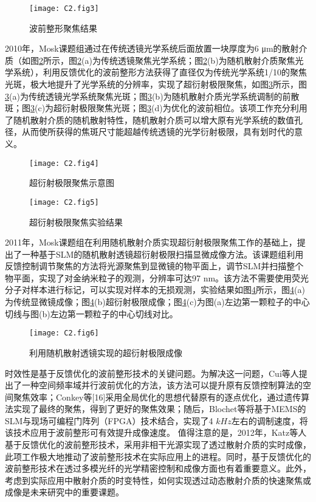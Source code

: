 \begin{figure}[htp]
	\centering
	\texttt{[image: C2.fig3]}
	\caption{波前整形聚焦结果}
	\label{fig2:3}
\end{figure}

2010年，Mosk课题组通过在传统透镜光学系统后面放置一块厚度为6 μm的散射介质（如图\ref{fig2:4}所示，图\ref{fig2:4}(a)为传统透镜聚焦光学系统；图\ref{fig2:4}(b)为随机散射介质聚焦光学系统），利用反馈优化的波前整形方法获得了直径仅为传统光学系统1/10的聚焦光斑，极大地提升了光学系统的分辨率，实现了超衍射极限聚焦，如图\ref{fig2:5}所示，图\ref{fig2:5}(a)为传统透镜光学系统聚焦光斑；图\ref{fig2:5}(b)为随机散射介质光学系统调制的前散斑；图\ref{fig2:5}(c)为超衍射极限聚焦光斑；图\ref{fig2:5}(d)为优化的波前相位。该项工作充分利用了随机散射介质的随机散射特性，随机散射介质可以增大原有光学系统的数值孔径，从而使所获得的焦斑尺寸能超越传统透镜的光学衍射极限，具有划时代的意义。

\begin{figure}[htp]
	\centering
	\texttt{[image: C2.fig4]}
	\caption{超衍射极限聚焦示意图}
	\label{fig2:4}
\end{figure}

\begin{figure}[htp]
	\centering
	\texttt{[image: C2.fig5]}
	\caption{超衍射极限聚焦实验结果}
	\label{fig2:5}
\end{figure}

2011年，Mosk课题组在利用随机散射介质实现超衍射极限聚焦工作的基础上，提出了一种基于SLM的随机散射透镜超衍射极限扫描显微成像方法。该课题组利用反馈控制调节聚焦的方法将光源聚焦到显微镜的物平面上，调节SLM并扫描整个物平面，实现了对金纳米粒子的观测，分辨率可达97 nm。该方法不需要使用荧光分子对样本进行标记，可以实现对样本的无损观测，实验结果如图\ref{fig2:6}所示，图\ref{fig2:6}(a)为传统显微镜成像；图\ref{fig2:6}(b)超衍射极限成像；图\ref{fig2:6}(c)为图(a)左边第一颗粒子的中心切线与图(b)左边第一颗粒子的中心切线对比。

\begin{figure}[htp]
	\centering
	\texttt{[image: C2.fig6]}
	\caption{利用随机散射透镜实现的超衍射极限成像}
	\label{fig2:6}
\end{figure}

时效性是基于反馈优化的波前整形技术的关键问题。为解决这一问题，Cui等人提出了一种空间频率域并行波前优化的方法，该方法可以提升原有反馈控制算法的空间聚焦效率；Conkey等[16]采用全局优化的思想代替原有的逐点优化，通过遗传算法实现了最终的聚焦，得到了更好的聚焦效果；随后，Blochet等将基于MEMS的SLM与现场可编程门阵列（FPGA）技术结合，实现了4 $kHz$左右的调制速度，将该技术应用于波前整形可有效提升成像速度。
值得注意的是，2012年，Katz等人基于反馈优化的波前整形技术，采用非相干光源实现了透过散射介质的实时成像，此项工作极大地推动了波前整形技术在实际应用上的进程。同时，基于反馈优化的波前整形技术在透过多模光纤的光学精密控制和成像方面也有着重要意义。此外，考虑到实际应用中散射介质的时变特性，如何实现透过动态散射介质的快速聚焦或成像是未来研究中的重要课题。

